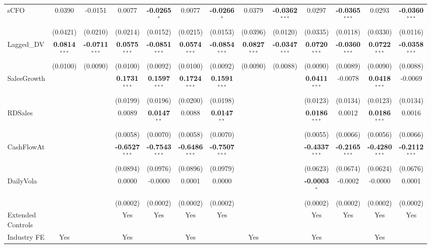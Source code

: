 \documentclass[11pt,a4paper]{article}
\begin{document}
\begin{table}[htbp]
\begin{tabular}{lcccccccccccc}
sCFO & 0.0390 & -0.0151 & 0.0077 & \textbf{-0.0265}$^{*}$ & 0.0077 & \textbf{-0.0266}$^{*}$ & 0.0379 & \textbf{-0.0362}$^{***}$ & 0.0297 & \textbf{-0.0365}$^{***}$ & 0.0293 & \textbf{-0.0360}$^{***}$ \\
 & (0.0421) & (0.0210) & (0.0214) & (0.0152) & (0.0215) & (0.0153) & (0.0396) & (0.0120) & (0.0335) & (0.0118) & (0.0330) & (0.0116) \\
Lagged\_DV & \textbf{0.0814}$^{***}$ & \textbf{-0.0711}$^{***}$ & \textbf{0.0575}$^{***}$ & \textbf{-0.0851}$^{***}$ & \textbf{0.0574}$^{***}$ & \textbf{-0.0854}$^{***}$ & \textbf{0.0827}$^{***}$ & \textbf{-0.0347}$^{***}$ & \textbf{0.0720}$^{***}$ & \textbf{-0.0360}$^{***}$ & \textbf{0.0722}$^{***}$ & \textbf{-0.0358}$^{***}$ \\
 & (0.0100) & (0.0090) & (0.0100) & (0.0092) & (0.0100) & (0.0092) & (0.0090) & (0.0088) & (0.0090) & (0.0089) & (0.0090) & (0.0088) \\
SalesGrowth &  &  & \textbf{0.1731}$^{***}$ & \textbf{0.1597}$^{***}$ & \textbf{0.1724}$^{***}$ & \textbf{0.1591}$^{***}$ &  &  & \textbf{0.0411}$^{***}$ & -0.0078 & \textbf{0.0418}$^{***}$ & -0.0069 \\
 &  &  & (0.0199) & (0.0196) & (0.0200) & (0.0198) &  &  & (0.0123) & (0.0134) & (0.0123) & (0.0134) \\
RDSales &  &  & 0.0089 & \textbf{0.0147}$^{**}$ & 0.0088 & \textbf{0.0147}$^{**}$ &  &  & \textbf{0.0186}$^{***}$ & 0.0012 & \textbf{0.0186}$^{***}$ & 0.0016 \\
 &  &  & (0.0058) & (0.0070) & (0.0058) & (0.0070) &  &  & (0.0055) & (0.0066) & (0.0056) & (0.0066) \\
CashFlowAt &  &  & \textbf{-0.6527}$^{***}$ & \textbf{-0.7543}$^{***}$ & \textbf{-0.6486}$^{***}$ & \textbf{-0.7507}$^{***}$ &  &  & \textbf{-0.4337}$^{***}$ & \textbf{-0.2165}$^{***}$ & \textbf{-0.4280}$^{***}$ & \textbf{-0.2112}$^{***}$ \\
 &  &  & (0.0894) & (0.0976) & (0.0896) & (0.0979) &  &  & (0.0623) & (0.0674) & (0.0624) & (0.0676) \\
DailyVola &  &  & 0.0000 & -0.0000 & 0.0001 & 0.0000 &  &  & \textbf{-0.0003}$^{*}$ & -0.0002 & -0.0000 & 0.0001 \\
 &  &  & (0.0002) & (0.0002) & (0.0002) & (0.0002) &  &  & (0.0002) & (0.0002) & (0.0002) & (0.0002) \\
\midrule
Extended Controls &  &  & Yes & Yes & Yes & Yes &  &  & Yes & Yes & Yes & Yes \\
Industry FE & Yes &  & Yes &  & Yes &  & Yes &  & Yes &  & Yes &  \\

\end{tabular}
\end{table}
\end{document}
